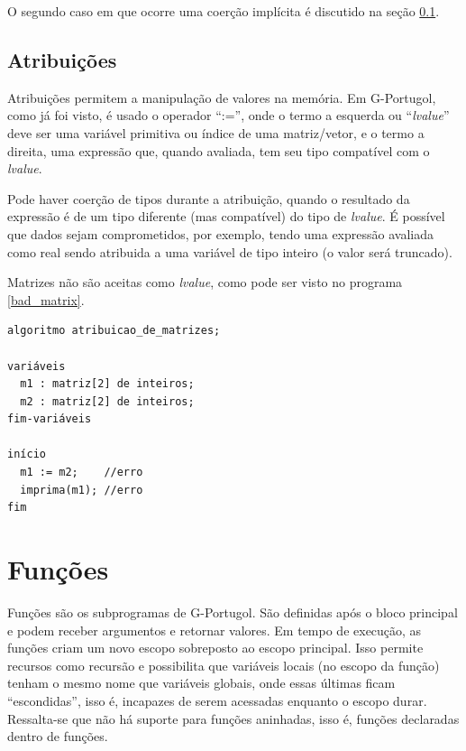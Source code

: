 \documentclass[a4paper,11pt]{report}
\begin{document}
O segundo caso em que ocorre uma coerção implícita é discutido na seção
\ref{subsec:atribuicoes}.

\subsection{Atribuições}
\label{subsec:atribuicoes}

Atribuições permitem a manipulação de valores na memória. Em G-Portugol, como já
foi visto, é usado o operador ``:='', onde o termo a esquerda ou
``\textit{lvalue}'' deve ser uma variável primitiva ou índice de uma
matriz/vetor, e o termo a direita, uma expressão que, quando avaliada, tem seu
tipo compatível com o \textit{lvalue}.

Pode haver coerção de tipos durante a atribuição, quando o resultado da
expressão é de um tipo diferente (mas compatível) do tipo de \textit{lvalue}. É
possível que dados sejam comprometidos, por exemplo, tendo uma expressão
avaliada como real sendo atribuida a uma variável de tipo inteiro (o valor será
truncado).

Matrizes não são aceitas como \textit{lvalue}, como pode ser visto no programa
\ref{bad_matrix}.

\begin{program}
  \begin{verbatim}
algoritmo atribuicao_de_matrizes;

variáveis
  m1 : matriz[2] de inteiros;
  m2 : matriz[2] de inteiros;
fim-variáveis

início
  m1 := m2;    //erro
  imprima(m1); //erro
fim
  \end{verbatim}

  \caption{Uso incorreto de matrizes. \label{bad_matrix}}
\end{program}

\section{Funções}

Funções são os subprogramas de G-Portugol. São definidas após o bloco principal
e podem receber argumentos e retornar valores. Em tempo de execução, as funções
criam um novo escopo sobreposto ao escopo principal. Isso permite recursos como
recursão e possibilita que variáveis locais (no escopo da função) tenham o mesmo
nome que variáveis globais, onde essas últimas ficam ``escondidas'', isso é,
incapazes de serem acessadas enquanto o escopo durar. Ressalta-se que não há
suporte para funções aninhadas, isso é, funções declaradas dentro de funções.
\end{document}
